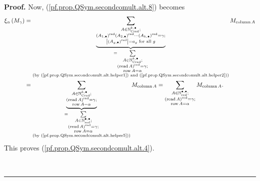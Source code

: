 \documentclass[numbers=enddot,12pt,final,onecolumn,notitlepage,abstracton]{scrartcl}%
\theoremstyle{definition}
\newenvironment{proof}[1][Proof]{\noindent\textbf{#1.} }{\ \rule{0.5em}{0.5em}}
\let\sumnonlimits\sum
\renewcommand{\sum}{\sumnonlimits\limits}
\begin{document}
\begin{proof}
Now, (\ref{pf.prop.QSym.secondcomult.alt.8}) becomes%
\begin{align*}
\xi_{\alpha}\left(  M_{\gamma}\right)   &  =\underbrace{\sum_{\substack{A\in
\mathbb{N}_{\operatorname*{Cred}}^{k,\bullet};\\\left(  A_{1,\bullet}\right)
^{\operatorname*{red}}\left(  A_{2,\bullet}\right)  ^{\operatorname*{red}%
}\cdots\left(  A_{k,\bullet}\right)  ^{\operatorname*{red}}=\gamma
;\\\left\vert \left(  A_{g,\bullet}\right)  ^{\operatorname*{red}}\right\vert
=a_{g}\text{ for all }g}}}_{\substack{=\sum_{\substack{A\in\mathbb{N}%
_{\operatorname*{Cred}}^{k,\bullet}\text{;}\\\left(  \operatorname*{read}%
A\right)  ^{\operatorname*{red}}=\gamma\text{;}\\\operatorname*{row}A=\alpha
}}\\\text{(by (\ref{pf.prop.QSym.secondcomult.alt.helper1}) and
(\ref{pf.prop.QSym.secondcomult.alt.helper2}))}}}M_{\operatorname*{column}A}\\
&  =\underbrace{\sum_{\substack{A\in\mathbb{N}_{\operatorname*{Cred}%
}^{k,\bullet}\text{;}\\\left(  \operatorname*{read}A\right)
^{\operatorname*{red}}=\gamma\text{;}\\\operatorname*{row}A=\alpha}%
}}_{\substack{=\sum_{\substack{A\in\mathbb{N}_{\operatorname*{red}}%
^{\bullet,\bullet}\text{;}\\\left(  \operatorname*{read}A\right)
^{\operatorname*{red}}=\gamma\text{;}\\\operatorname*{row}A=\alpha
}}\\\text{(by (\ref{pf.prop.QSym.secondcomult.alt.helper5}))}}%
}M_{\operatorname*{column}A}=\sum_{\substack{A\in\mathbb{N}%
_{\operatorname*{red}}^{\bullet,\bullet}\text{;}\\\left(  \operatorname*{read}%
A\right)  ^{\operatorname*{red}}=\gamma\text{;}\\\operatorname*{row}A=\alpha
}}M_{\operatorname*{column}A}.
\end{align*}
This proves (\ref{pf.prop.QSym.secondcomult.alt.4}).


\end{proof}
\end{document}
